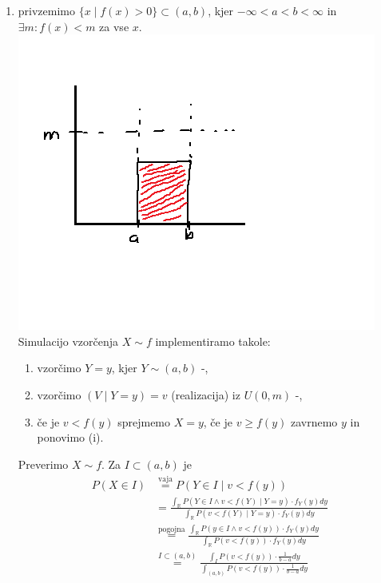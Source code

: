 \documentclass[a4paper, 12pt]{book}
\theoremstyle{definition}
\theoremstyle{remark}
\newcommand{\R}{\mathbb{R}}
\begin{document}
\begin{enumerate}[label={A/R \#\arabic{*}:}]
  \item privzemimo $\{x \mid f(x) > 0\} \subset (a,b)$, kjer $-\infty < a < b < \infty$ in $\exists m: f(x) < m$ za vse $x$. \\
    \includegraphics[scale=0.5]{meja_območje_3_3} \\
    Simulacijo vzorčenja $X \sim f$ implementiramo takole:
    \begin{enumerate}[label=(\roman*)]
      \item vzorčimo $Y=y$, kjer $Y \sim (a,b)$ -,
      \item vzorčimo $(V \mid Y=y) = v$ (realizacija) iz $U(0,m)$ -,
      \item če je $v < f(y)$ sprejmemo $X=y$, če je $v \geq f(y)$ zavrnemo $y$ in ponovimo (i).
    \end{enumerate}
    Preverimo $X \sim f$. Za $I \subset (a,b)$ je
    \begin{align*}
      P(X \in I) &\stackrel{\text{vaja}}{=} P(Y \in I \mid v < f(y)) \\
      &= \frac{\int_{\R} P(Y \in I \land v < f(Y) \mid Y=y) \cdot f_Y(y) dy}
        {\int_{\R} P(v < f(Y) \mid Y=y) \cdot f_Y(y) dy} \\
      &\stackrel{\text{pogojna}}{=} \frac{\int_{\R} P(y \in I \land v < f(y)) \cdot f_Y(y) dy}
        {\int_{\R} P(v < f(y)) \cdot f_Y(y) dy} \\
      &\stackrel{I \subset (a,b)}{=} \frac{\int_{I} P(v < f(y)) \cdot \frac{1}{b-a} dy}
        {\int_{(a,b)} P(v < f(y)) \cdot \frac{1}{b-a} dy} \\

\end{align*}
\end{enumerate}
\end{document}
